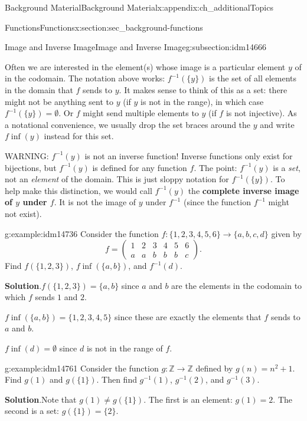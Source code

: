 \documentclass[oneside,10pt,]{book}
\newcommand{\terminology}[1]{\textbf{#1}}
\numberwithin{equation}{chapter}
\def\Z{\mathbb Z}
\def\inv{^{-1}}
\newcommand{\amp}{&}
\begin{document}
\begin{appendixptx}{Background Material}{}{Background Material}{}{}{x:appendix:ch_additionalTopics}
\begin{sectionptx}{Functions}{}{Functions}{}{}{x:section:sec_background-functions}
\begin{subsectionptx}{Image and Inverse Image}{}{Image and Inverse Image}{}{}{g:subsection:idm14666}
\par
Often we are interested in the element(s) whose image is a particular element \(y\) of in the codomain.  The notation above works: \(f\inv(\{y\})\) is the set of all elements in the domain that \(f\) sends to \(y\).  It makes sense to think of this as a set: there might not be anything sent to \(y\) (if \(y\) is not in the range), in which case \(f\inv(\{y\}) = \emptyset\).  Or \(f\) might send multiple elements to \(y\) (if \(f\) is not injective).  As a notational convenience, we usually drop the set braces around the \(y\) and write \(f\inf(y)\) instead for this set.%
\par
WARNING: \(f\inv(y)\) is not an inverse function! Inverse functions only exist for bijections, but \(f\inv(y)\) is defined for any function \(f\). The point: \(f\inv(y)\) is a \emph{set}, not an \emph{element} of the domain.  This is just sloppy notation for \(f\inv(\{y\})\).  To help make this distinction, we would call \(f\inv(y)\) the \terminology{complete inverse image of \(y\) under \(f\)}.  It is not the image of \(y\) under \(f\inv\) (since the function \(f\inv\) might not exist).%
\begin{example}{}{g:example:idm14736}%
Consider the function \(f:\{1,2,3,4,5,6\} \to \{a,b,c,d\}\) given by%
\begin{equation*}
f = \begin{pmatrix}1 \amp 2 \amp 3 \amp 4 \amp 5 \amp 6 \\ a \amp a \amp b \amp b \amp b \amp c\end{pmatrix}.
\end{equation*}
Find \(f(\{1,2,3\})\),  \(f\inf(\{a,b\})\), and \(f\inv(d)\).%
\par\smallskip%
\noindent\textbf{Solution}.\hypertarget{g:solution:idm14744}{}\quad{}\(f(\{1,2,3\}) = \{a,b\}\) since \(a\) and \(b\) are the elements in the codomain to which \(f\) sends \(1\) and \(2\).%
\par
\(f\inf(\{a,b\}) = \{1,2,3,4,5\}\) since these are exactly the elements that \(f\) sends to \(a\) and \(b\).%
\par
\(f\inf(d) = \emptyset\) since \(d\) is not in the range of \(f\).%
\end{example}
\begin{example}{}{g:example:idm14761}%
Consider the function \(g:\Z \to \Z\) defined by \(g(n) = n^2 + 1\). Find \(g(1)\) and \(g(\{1\})\).  Then find \(g\inv(1)\), \(g\inv(2)\), and \(g\inv(3)\).%
\par\smallskip%
\noindent\textbf{Solution}.\hypertarget{g:solution:idm14771}{}\quad{}Note that \(g(1) \ne g(\{1\})\).  The first is an element: \(g(1) = 2\).  The second is a set: \(g(\{1\}) = \{2\}\).%

\end{example}
\end{subsectionptx}
\end{sectionptx}
\end{appendixptx}
\end{document}
